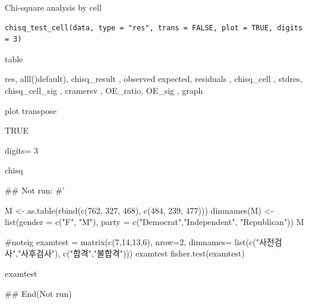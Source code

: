 \documentclass[a4paper]{book}
\begin{document}
%
\begin{Description}
Chi-square analysis by cell
\end{Description}
%
\begin{Usage}
\begin{verbatim}
chisq_test_cell(data, type = "res", trans = FALSE, plot = TRUE, digits = 3)
\end{verbatim}
\end{Usage}
%
\begin{Arguments}
\begin{ldescription}
\item[\code{data}] table

\item[\code{type}] res, alll()default), chisq\_result , observed   expected,   residuals ,  chisq\_cell ,  stdres, chisq\_cell\_sig ,  cramersv ,  OE\_ratio,    OE\_sig ,   graph

\item[\code{trans}] plot transpose

\item[\code{plot}] TRUE

\item[\code{digits}] digits= 3
\end{ldescription}
\end{Arguments}
%
\begin{Value}
chisq
\end{Value}
%
\begin{Examples}
\begin{ExampleCode}

\#\# Not run: 
#'


M <- as.table(rbind(c(762, 327, 468), c(484, 239, 477)))
dimnames(M) <- list(gender = c("F", "M"),
                    party = c("Democrat","Independent", "Republican"))
M %

#notsig
examtest  = matrix(c(7,14,13,6), nrow=2,
                   dimnames= list(c("사전검사","사후검사"),
                                  c("합격","불합격")))
examtest
fisher.test(examtest)

examtest %

## End(Not run)


\end{ExampleCode}
\end{Examples}
\end{document}
